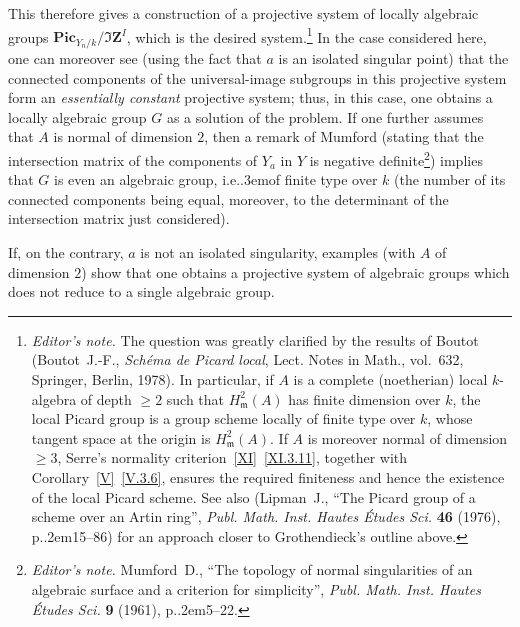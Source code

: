 \documentclass[11pt,a4paper,oneside]{book}
\providecommand{\sisi}[2]{#2}
\providecommand{\pageoriginale}{%
  \refstepcounter{pageoriginal}%
  \marginpar{\raggedright\footnotesize\bfseries\thepageoriginal}%
  \xspace}
\providecommand{\nde}[1]{\footnote{\textit{Editor's note.} #1}}
\providecommand{\og}{``}
\providecommand{\fg}{''\xspace}
\providecommand{\ie}{i.e.\kern.3em}
\providecommand{\ptbl}{.\kern.2em}
\providecommand{\ZZ}{\mathbf Z}
\providecommand{\ideal}[1]{\mathfrak{#1}}
\providecommand{\m}{\ideal m}
\theoremstyle{plain}
\theoremstyle{definition}
\theoremstyle{remark}
\renewcommand{\Ref}[1]{\textup{\ref{#1}}}
\begin{document}
This therefore gives a construction of a projective system of locally algebraic groups $\mathbf{Pic}_{Y_n/k}/\Im \ZZ^I$, which is the desired system.\nde{\label{Boutot}The question was greatly clarified by the results of {Boutot} (Boutot~J.-F., \emph{Sch\'ema de {P}icard local}, Lect. Notes in Math., vol.~632, Springer, Berlin, 1978). In particular, if $A$ is a complete (noetherian) local $k$-algebra of depth $\geq 2$ such that $H^2_\m(A)$ has finite dimension over $k$, the local Picard group is a group scheme locally of finite type over $k$, whose tangent space at the origin is $H^2_\m(A)$. If $A$ is moreover normal of dimension $\geq 3$, Serre's normality criterion~\Ref{XI}~\Ref{XI.3.11}, together with Corollary~\Ref{V}~\Ref{V.3.6}, ensures the required finiteness and hence the existence of the local Picard scheme. See also (Lipman~J., {\og The Picard group of a scheme over an Artin ring\fg}, \emph{Publ. Math. Inst. Hautes \'Etudes Sci.} \textbf{46} (1976), p\ptbl 15--86) for an approach closer to Grothendieck's outline above.} In the case considered here, one can moreover see (using the fact that $a$ is an isolated singular point) that the connected components of the universal-image subgroups\pageoriginale in this projective system form an \emph{essentially constant} projective system; thus, in this case, one obtains a locally algebraic group $G$ as a solution of the problem. If one further assumes that $A$ is normal of dimension $2$, then a remark of \sisi{MUMFORD}{Mumford} (stating that the intersection matrix of the components of $Y_{a}$ in $Y$ is negative definite\nde{Mumford~D., {\og The topology of normal singularities of an algebraic surface and a criterion for simplicity\fg}, \emph{Publ. Math. Inst. Hautes \'Etudes Sci.} \textbf{9} (1961), p\ptbl 5--22.}) implies that $G$ is even an algebraic group, \ie of finite type over $k$ (the number of its connected components being equal, moreover, to the determinant of the intersection matrix just considered).

If, on the contrary, $a$ is not an isolated singularity, examples (with $A$ of dimension $2$) show that one obtains a projective system of algebraic groups which does not reduce to a single algebraic group.
\end{document}
